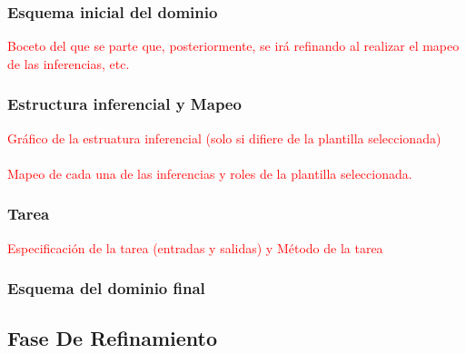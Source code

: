 \documentclass[12pt,a4paper,twoside,spanish]{article}      %
\begin{document}
\subsubsection{Esquema inicial del dominio}
\textcolor {red} {Boceto del que se parte que, posteriormente, se irá refinando al realizar el mapeo de las inferencias, etc.}

\subsubsection{Estructura inferencial y Mapeo}

\textcolor {red} {Gráfico de la estruatura inferencial (solo si difiere de la plantilla seleccionada) \\ \\ Mapeo de cada una de las inferencias y roles de la plantilla seleccionada.}

\subsubsection{Tarea}
\textcolor {red} {Especificación de la tarea (entradas y salidas) y Método de la tarea}

\subsubsection{Esquema del dominio final}



\subsection{Fase De Refinamiento}


\end{document}
